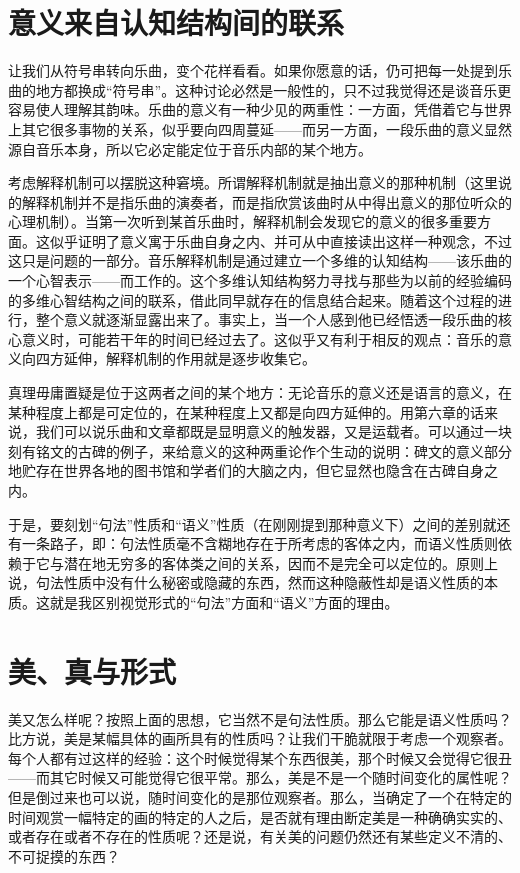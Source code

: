 \section{意义来自认知结构间的联系}

让我们从符号串转向乐曲，变个花样看看。如果你愿意的话，仍可把每一处提到乐曲的地方都换成“符号串”。这种讨论必然是一般性的，只不过我觉得还是谈音乐更容易使人理解其韵味。乐曲的意义有一种少见的两重性：一方面，凭借着它与世界上其它很多事物的关系，似乎要向四周蔓延——而另一方面，一段乐曲的意义显然源自音乐本身，所以它必定能定位于音乐内部的某个地方。

考虑解释机制可以摆脱这种窘境。所谓解释机制就是抽出意义的那种机制（这里说的解释机制并不是指乐曲的演奏者，而是指欣赏该曲时从中得出意义的那位听众的心理机制）。当第一次听到某首乐曲时，解释机制会发现它的意义的很多重要方面。这似乎证明了意义寓于乐曲自身之内、并可从中直接读出这样一种观念，不过这只是问题的一部分。音乐解释机制是通过建立一个多维的认知结构——该乐曲的一个心智表示——而工作的。这个多维认知结构努力寻找与那些为以前的经验编码的多维心智结构之间的联系，借此同早就存在的信息结合起来。随着这个过程的进行，整个意义就逐渐显露出来了。事实上，当一个人感到他已经悟透一段乐曲的核心意义时，可能若干年的时间已经过去了。这似乎又有利于相反的观点：音乐的意义向四方延伸，解释机制的作用就是逐步收集它。

真理毋庸置疑是位于这两者之间的某个地方：无论音乐的意义还是语言的意义，在某种程度上都是可定位的，在某种程度上又都是向四方延伸的。用第六章的话来说，我们可以说乐曲和文章都既是显明意义的触发器，又是运载者。可以通过一块刻有铭文的古碑的例子，来给意义的这种两重论作个生动的说明：碑文的意义部分地贮存在世界各地的图书馆和学者们的大脑之内，但它显然也隐含在古碑自身之内。

于是，要刻划“句法”性质和“语义”性质（在刚刚提到那种意义下）之间的差别就还有一条路子，即：句法性质毫不含糊地存在于所考虑的客体之内，而语义性质则依赖于它与潜在地无穷多的客体类之间的关系，因而不是完全可以定位的。原则上说，句法性质中没有什么秘密或隐藏的东西，然而这种隐蔽性却是语义性质的本质。这就是我区别视觉形式的“句法”方面和“语义”方面的理由。

\section{美、真与形式}

美又怎么样呢？按照上面的思想，它当然不是句法性质。那么它能是语义性质吗？比方说，美是某幅具体的画所具有的性质吗？让我们干脆就限于考虑一个观察者。每个人都有过这样的经验：这个时候觉得某个东西很美，那个时候又会觉得它很丑——而其它时候又可能觉得它很平常。那么，美是不是一个随时间变化的属性呢？但是倒过来也可以说，随时间变化的是那位观察者。那么，当确定了一个在特定的时间观赏一幅特定的画的特定的人之后，是否就有理由断定美是一种确确实实的、或者存在或者不存在的性质呢？还是说，有关美的问题仍然还有某些定义不清的、不可捉摸的东西？

